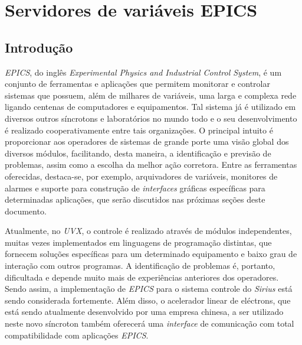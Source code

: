 \section{Servidores de variáveis EPICS}
\label{sec:pcaspy}

\subsection{Introdução}

\textit{EPICS}, do inglês \textit{Experimental Physics and Industrial Control
System}, é um conjunto de ferramentas e aplicações que permitem monitorar e
controlar sistemas que possuem, além de milhares de variáveis, uma larga e
complexa rede ligando centenas de computadores e equipamentos. Tal sistema já é
utilizado em diversos outros síncrotons e laboratórios no mundo todo e o seu
desenvolvimento é realizado cooperativamente entre tais organizações. O
principal intuito é proporcionar aos operadores de sistemas de grande porte uma
visão global dos diversos módulos, facilitando, desta maneira, a identificação e
previsão de problemas, assim como a escolha da melhor ação corretora. Entre as
ferramentas oferecidas, destaca-se, por exemplo, arquivadores de variáveis,
monitores de alarmes e suporte para construção de \textit{interfaces} gráficas
específicas para determinadas aplicações, que serão discutidos nas próximas
seções deste documento.

\vspace{12pt}

Atualmente, no \textit{UVX}, o controle é realizado através de módulos
independentes, muitas vezes implementados em linguagens de programação
distintas, que fornecem soluções específicas para um determinado equipamento e
baixo grau de interação com outros programas. A identificação de problemas é,
portanto, dificultada e depende muito mais de experiências anteriores dos
operadores. Sendo assim, a implementação de \textit{EPICS} para o sistema
controle do \textit{Sirius} está sendo considerada fortemente. Além disso, o
acelerador linear de eléctrons, que está sendo atualmente desenvolvido por uma
empresa chinesa, a ser utilizado neste novo síncroton também oferecerá  uma
\textit{interface} de comunicação com total compatibilidade com aplicações
\textit{EPICS}.

\vspace{12pt}


